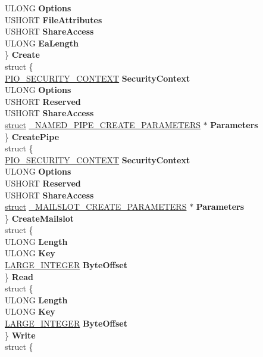 \begin{DoxyCompactItemize}
\begin{tabbing}
\>\>ULONG {\bfseries Options}\\
\>\>USHORT {\bfseries FileAttributes}\\
\>\>USHORT {\bfseries ShareAccess}\\
\>\>ULONG {\bfseries EaLength}\\
\>\} {\bfseries Create}\\
\>struct \{\\
\>\>\hyperlink{struct___i_o___s_e_c_u_r_i_t_y___c_o_n_t_e_x_t}{PIO\_SECURITY\_CONTEXT} {\bfseries SecurityContext}\\
\>\>ULONG {\bfseries Options}\\
\>\>USHORT {\bfseries Reserved}\\
\>\>USHORT {\bfseries ShareAccess}\\
\>\>\hyperlink{interfacestruct}{struct} \hyperlink{struct___n_a_m_e_d___p_i_p_e___c_r_e_a_t_e___p_a_r_a_m_e_t_e_r_s}{\_NAMED\_PIPE\_CREATE\_PARAMETERS} $\ast$ {\bfseries Parameters}\\
\>\} {\bfseries CreatePipe}\\
\>struct \{\\
\>\>\hyperlink{struct___i_o___s_e_c_u_r_i_t_y___c_o_n_t_e_x_t}{PIO\_SECURITY\_CONTEXT} {\bfseries SecurityContext}\\
\>\>ULONG {\bfseries Options}\\
\>\>USHORT {\bfseries Reserved}\\
\>\>USHORT {\bfseries ShareAccess}\\
\>\>\hyperlink{interfacestruct}{struct} \hyperlink{struct___m_a_i_l_s_l_o_t___c_r_e_a_t_e___p_a_r_a_m_e_t_e_r_s}{\_MAILSLOT\_CREATE\_PARAMETERS} $\ast$ {\bfseries Parameters}\\
\>\} {\bfseries CreateMailslot}\\
\>struct \{\\
\>\>ULONG {\bfseries Length}\\
\>\>ULONG {\bfseries Key}\\
\>\>\hyperlink{union___l_a_r_g_e___i_n_t_e_g_e_r}{LARGE\_INTEGER} {\bfseries ByteOffset}\\
\>\} {\bfseries Read}\\
\>struct \{\\
\>\>ULONG {\bfseries Length}\\
\>\>ULONG {\bfseries Key}\\
\>\>\hyperlink{union___l_a_r_g_e___i_n_t_e_g_e_r}{LARGE\_INTEGER} {\bfseries ByteOffset}\\
\>\} {\bfseries Write}\\
\>struct \{\\

\end{tabbing}
\end{DoxyCompactItemize}
